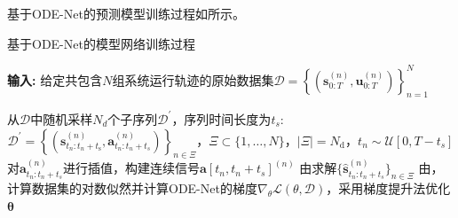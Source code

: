 基于ODE-Net的预测模型训练过程如所示。
\begin{algorithm}[htb]
\caption{基于ODE-Net的模型网络训练过程} %
\label{alg:dyn}
\hspace*{0.02in} {\bf 输入:} %
给定共包含$N$组系统运行轨迹的原始数据集$\mathcal{D}=\left\{\left(\mathbf{s}_{0: T}^{(n)}, \mathbf{u}_{0: T}^{(n)}\right)\right\}_{n=1}^{N}$
\begin{algorithmic}[1]
\State 从$\mathcal{D}$中随机采样$N_d$个子序列$\mathcal{D}^{\prime}$，序列时间长度为$t_s$:
$$
\mathcal{D}^{\prime}=\left\{\left(\mathbf{s}_{t_{n}: t_{n}+t_{\mathrm{s}}}^{(n)}, \mathbf{a}_{t_{n}: t_{n}+t_{s}}^{(n)}\right)\right\}_{n \in \Xi}\text{，} \Xi \subset\{1, \ldots, N\}\text{，}|\Xi|=N_{\mathrm{d}}\text{，} t_{n} \sim \mathcal{U}\left[0, T-t_{s}\right]
$$
\State 对$\mathbf{a}_{t_{n}: t_{n}+t_{s}}^{(n)}$进行插值，构建连续信号$\mathbf{a}[t_{n}, t_{n}+t_{s}]^{(n)}$
\State 由求解$\{\hat{\mathbf{s}}_{t_n:t_n+t_s}^{(n)}\}_{n \in \Xi}$
\State 由，计算数据集的对数似然并计算ODE-Net的梯度$\nabla_\theta \mathcal{L}(\theta, \mathcal{D})$，采用梯度提升法优化$\boldsymbol{\theta}$
\EndFor
\end{algorithmic}
\end{algorithm}

